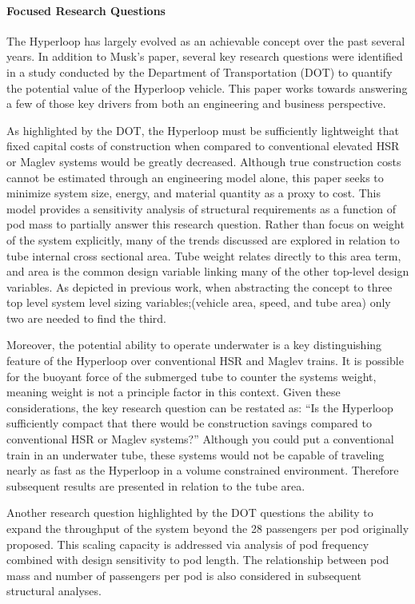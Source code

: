 \paragraph{Focused Research Questions}

	The Hyperloop has largely evolved as an achievable concept over the past several years.
	In addition to Musk's paper, several key research questions were identified in a study conducted
	by the Department of Transportation (DOT) to quantify the potential value of the
	Hyperloop vehicle. \cite{Volpe} This paper works towards answering a few of
	those key drivers from both an engineering and business perspective.

	As highlighted by the DOT, the Hyperloop must be sufficiently lightweight
	that fixed capital costs of construction when compared to conventional
	elevated HSR or Maglev systems would be greatly decreased.
	Although true construction costs cannot be estimated through an engineering
	model alone, this paper seeks to minimize system size, energy, and material
	quantity as a proxy to cost. This model provides a sensitivity
	analysis of structural requirements as a function of pod mass to partially
	answer this research question. Rather than focus on weight of the system explicitly,
	many of the trends discussed are explored in relation to tube internal
	cross sectional area. Tube weight relates directly to this area term, and
	area is the common design variable linking many of the other top-level
	design variables. As depicted in previous work,
	\cite{Chin} when abstracting the concept to three top level system level
	sizing variables;(vehicle area, speed, and tube area) only two are needed
	to find the third.

	Moreover, the potential ability to operate underwater is a key distinguishing feature
	of the Hyperloop over conventional HSR and Maglev trains. It is possible for the buoyant force
	of the submerged tube to counter the systems weight, meaning weight is not
	a principle factor in this context.
	Given these considerations, the key research
	question can be restated as: ``Is the Hyperloop sufficiently compact that
	there would be construction savings compared to conventional
	HSR or Maglev systems?'' Although you could put a conventional train in an
	underwater tube, these systems would not be capable of traveling nearly as
	fast as the Hyperloop in a volume constrained environment.
	Therefore subsequent results are presented in relation to the tube area.

	Another research question highlighted by the DOT questions the ability to
	expand the throughput of the system beyond the 28 passengers per pod
	originally proposed. This scaling capacity is addressed
	via analysis of pod frequency combined with design sensitivity to pod length.
	The relationship between pod mass and number of passengers per pod is also
	considered in subsequent structural analyses.

